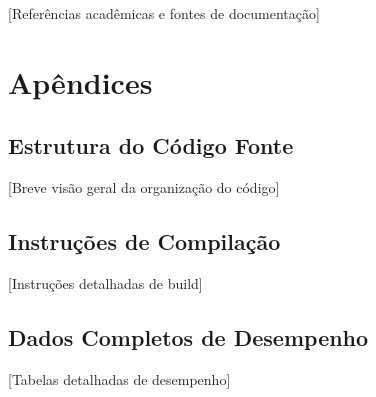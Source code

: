 \documentclass[a4paper,11pt]{article}
\begin{document}
[Referências acadêmicas e fontes de documentação]

\section{Apêndices}

\subsection{Estrutura do Código Fonte}
[Breve visão geral da organização do código]

\subsection{Instruções de Compilação}
[Instruções detalhadas de build]

\subsection{Dados Completos de Desempenho}
[Tabelas detalhadas de desempenho]
\end{document}
